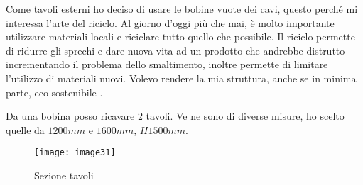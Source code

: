 Come tavoli esterni ho deciso di usare le bobine vuote dei cavi, questo perché mi interessa l’arte del riciclo. Al giorno d’oggi più che mai, è molto importante utilizzare materiali locali e riciclare tutto quello che possibile. Il riciclo permette di ridurre gli sprechi e  dare nuova vita ad un prodotto che andrebbe distrutto incrementando il problema dello smaltimento, inoltre permette di limitare l’utilizzo di materiali nuovi.  Volevo rendere la mia struttura, anche se in minima parte, eco-sostenibile .

Da una bobina posso ricavare 2 tavoli.  Ve ne sono di diverse misure, ho scelto quelle da  $1200 mm$ e $1600 mm$, $H 1500 mm$.

\begin{figure}[H]
	\centering
	\texttt{[image: image31]}
	\caption{Sezione tavoli}
	\label{fig:mesh1}
\end{figure}
